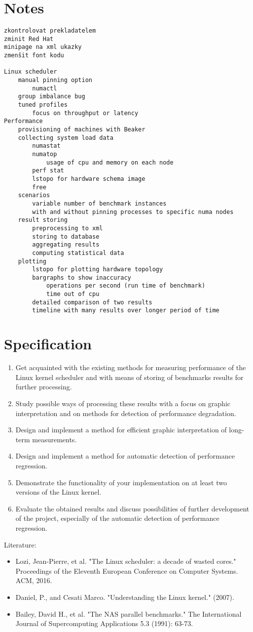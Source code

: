 \chapter{Notes}
\begin{verbatim}
zkontrolovat prekladatelem
zminit Red Hat
minipage na xml ukazky
zmenšit font kodu

Linux scheduler
    manual pinning option
        numactl
    group imbalance bug
    tuned profiles
        focus on throughput or latency
Performance
    provisioning of machines with Beaker
    collecting system load data
        numastat
        numatop
            usage of cpu and memory on each node
        perf stat
        lstopo for hardware schema image
        free
    scenarios
        variable number of benchmark instances
        with and without pinning processes to specific numa nodes
    result storing
        preprocessing to xml
        storing to database
        aggregating results
        computing statistical data
    plotting
        lstopo for plotting hardware topology
        bargraphs to show inaccuracy
            operations per second (run time of benchmark)
            time out of cpu
        detailed comparison of two results
        timeline with many results over longer period of time
\end{verbatim}

\chapter{Specification}
\begin{enumerate}
\item Get acquainted with the existing methods for measuring performance of the Linux kernel scheduler and with means of storing of benchmarks results for further processing.
\item Study possible ways of processing these results with a focus on graphic interpretation and on methods for detection of performance degradation.
\item Design and implement a method for efficient graphic interpretation of long-term measurements.
\item Design and implement a method for automatic detection of performance regression.
\item Demonstrate the functionality of your implementation on at least two versions of the Linux kernel.
\item Evaluate the obtained results and discuss possibilities of further development of the project, especially of the automatic detection of performance regression.
\end{enumerate}

Literature:
\begin{itemize}
\item Lozi, Jean-Pierre, et al. "The Linux scheduler: a decade of wasted cores." Proceedings of the Eleventh European Conference on Computer Systems. ACM, 2016.
\item Daniel, P., and Cesati Marco. "Understanding the Linux kernel." (2007).
\item Bailey, David H., et al. "The NAS parallel benchmarks." The International Journal of Supercomputing Applications 5.3 (1991): 63-73.
\end{itemize}
